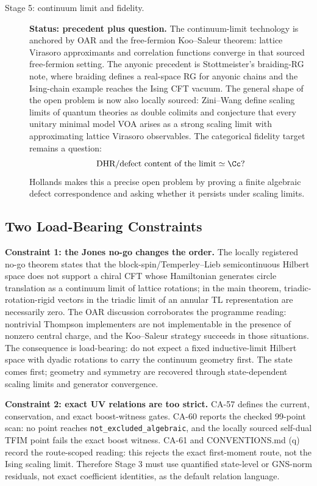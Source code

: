 \begin{description}
\item[Stage 5: continuum limit and fidelity.]
\textbf{Status: precedent plus question.}  The continuum-limit technology is
anchored by OAR and the free-fermion Koo--Saleur theorem: lattice Virasoro
approximants and correlation functions converge in that sourced free-fermion
setting.  The anyonic precedent is Stottmeister's braiding-RG note, where
braiding defines a real-space RG for anyonic chains and the Ising-chain example
reaches the Ising CFT vacuum.  The general shape of the open problem is now
also locally sourced: Zini--Wang define scaling limits of quantum theories as
double colimits and conjecture that every unitary minimal model VOA arises as a
strong scaling limit with approximating lattice Virasoro observables.  The
categorical fidelity target remains a question:
\[
  \text{DHR/defect content of the limit} \simeq \Cc?
\]
Hollands makes this a precise open problem by proving a finite algebraic
defect correspondence and asking whether it persists under scaling limits.
\end{description}

\subsection{Two Load-Bearing Constraints}

\textbf{Constraint 1: the Jones no-go changes the order.}  The locally
registered no-go theorem states that the block-spin/Temperley--Lieb
semicontinuous Hilbert space does not support a chiral CFT whose Hamiltonian
generates circle translation as a continuum limit of lattice rotations; in the
main theorem, triadic-rotation-rigid vectors in the triadic limit of an annular
TL representation are necessarily zero.  The OAR discussion corroborates the
programme reading: nontrivial Thompson implementers are not implementable in
the presence of nonzero central charge, and the Koo--Saleur strategy succeeds
in those situations.  The consequence is load-bearing: do not expect a fixed
inductive-limit Hilbert space with dyadic rotations to carry the continuum
geometry first.  The state comes first; geometry and symmetry are recovered
through state-dependent scaling limits and generator convergence.

\textbf{Constraint 2: exact UV relations are too strict.}  CA-57 defines the
current, conservation, and exact boost-witness gates.  CA-60 reports the
checked 99-point scan: no point reaches \texttt{not\_excluded\_algebraic}, and
the locally sourced self-dual TFIM point fails the exact boost witness.  CA-61
and CONVENTIONS.md (q) record the route-scoped reading: this rejects the exact
first-moment route, not the Ising scaling limit.  Therefore Stage 3 must use
quantified state-level or GNS-norm residuals, not exact coefficient identities,
as the default relation language.

